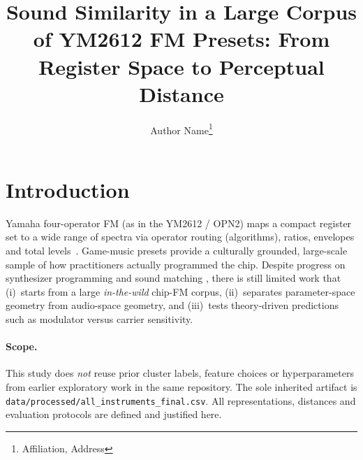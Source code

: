 \documentclass{article}
\title{Sound Similarity in a Large Corpus of YM2612 FM Presets:
       From Register Space to Perceptual Distance}
\author{%
Author Name\thanks{Affiliation, Address}%
}
\date{}
\begin{document}

\section{Introduction}
\label{sec:intro}

Yamaha four-operator FM (as in the YM2612 / OPN2) maps a compact register set
to a wide range of spectra via operator routing (algorithms), ratios, envelopes
and total levels~\citep{chowning1973}.
Game-music presets provide a culturally grounded, large-scale sample of how
practitioners actually programmed the chip.
Despite progress on synthesizer programming and sound matching
\cite{yeeking2018,chen2022sound2synth,levaillant2024spinvae2},
there is still limited work that (i)~starts from a large \emph{in-the-wild}
chip-FM corpus, (ii)~separates parameter-space geometry from audio-space
geometry, and (iii)~tests theory-driven predictions such as modulator versus
carrier sensitivity.

\paragraph{Scope.}
This study does \emph{not} reuse prior cluster labels, feature choices or
hyperparameters from earlier exploratory work in the same repository.
The sole inherited artifact is
\texttt{data/processed/all\_instruments\_final.csv}.
All representations, distances and evaluation protocols are defined and
justified here.
\end{document}
